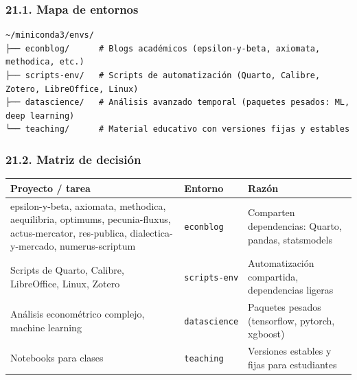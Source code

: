 \documentclass[
  doc,
  floatsintext,
  longtable,
  a4paper,
  nolmodern,
  notxfonts,
  notimes,
  12pt,
  colorlinks=true,linkcolor=blue,citecolor=blue,urlcolor=blue]{apa7}
\newcounter{none} %
\begin{document}
\subsubsection{21.1. Mapa de entornos}\label{mapa-de-entornos}

\begin{verbatim}
~/miniconda3/envs/
├── econblog/      # Blogs académicos (epsilon-y-beta, axiomata, methodica, etc.)
├── scripts-env/   # Scripts de automatización (Quarto, Calibre, Zotero, LibreOffice, Linux)
├── datascience/   # Análisis avanzado temporal (paquetes pesados: ML, deep learning)
└── teaching/      # Material educativo con versiones fijas y estables
\end{verbatim}

\subsubsection{21.2. Matriz de decisión}\label{matriz-de-decisiuxf3n}

{\def\LTcaptype{none} %
\begin{longtable}[]{@{}
  >{\raggedright\arraybackslash}p{}
  >{\raggedright\arraybackslash}p{}
  >{\raggedright\arraybackslash}p{}@{}}
\toprule\noalign{}
\begin{minipage}[b]{\linewidth}\raggedright
Proyecto / tarea
\end{minipage} & \begin{minipage}[b]{\linewidth}\raggedright
Entorno
\end{minipage} & \begin{minipage}[b]{\linewidth}\raggedright
Razón
\end{minipage} \\
\midrule\noalign{}
\endhead
\bottomrule\noalign{}
\endlastfoot
epsilon-y-beta, axiomata, methodica, aequilibria, optimums,
pecunia-fluxus, actus-mercator, res-publica, dialectica-y-mercado,
numerus-scriptum & \texttt{econblog} & Comparten dependencias: Quarto,
pandas, statsmodels \\
Scripts de Quarto, Calibre, LibreOffice, Linux, Zotero &
\texttt{scripts-env} & Automatización compartida, dependencias
ligeras \\
Análisis econométrico complejo, machine learning & \texttt{datascience}
& Paquetes pesados (tensorflow, pytorch, xgboost) \\
Notebooks para clases & \texttt{teaching} & Versiones estables y fijas
para estudiantes \\
\end{longtable}
}
\end{document}
